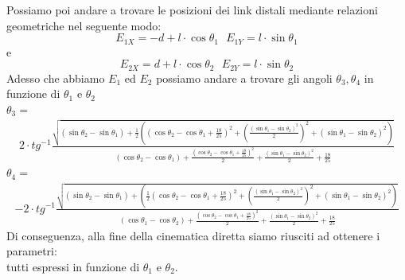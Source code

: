 Possiamo poi andare a trovare le posizioni dei link distali mediante relazioni geometriche nel seguente modo: 
\begin{equation*}
    E_{1X} = -d+l\cdot \cos\theta_1 \ \ \  E_{1Y}=l\cdot \sin\theta_1
\end{equation*}
e
\begin{equation*}
    E_{2X} = d+ l\cdot \cos\theta_2 \ \ \  E_{2Y} = l\cdot \sin\theta_2
\end{equation*}
Adesso che abbiamo $E_1$ ed $E_2$ possiamo andare a trovare gli angoli $\theta_3 , \theta_4$ in funzione di $\theta_1$ e $\theta_2$
\\$\theta_3 =$
\begin{equation*}
    \begin{aligned}
    2\cdot tg^{-1}\frac{\sqrt{ (\sin\theta_2 - \sin\theta_1) + \frac{1}{2}((\cos\theta_2 - \cos\theta_1 + \frac{18}{25})^2+(\frac{(\sin\theta_1-\sin\theta_2)^2}{2})^2+(\sin\theta_1-\sin\theta_2)^2)}}{(\cos\theta_2-\cos\theta_1)+\frac{(\cos\theta_2-\cos\theta_1+\frac{18}{25})^2}{2}+\frac{(\sin\theta_1-\sin\theta_2)^2}{2}+\frac{18}{25}}
    \end{aligned}
\end{equation*}
$\theta_4 =$
\begin{equation*}
    \begin{aligned}
    -2\cdot tg^{-1}\frac{\sqrt{(\sin\theta_2-\sin\theta_1)+(\frac{1}{2}(\cos\theta_2-\cos\theta_1+\frac{18}{25})^2+(\frac{(\sin\theta_1-\sin\theta_2)^2}{2})^2+(\sin\theta_1-\sin\theta_2)^2)}}
    {(\cos\theta_1 -\cos\theta_2)+\frac{(\cos\theta_2-\cos\theta_1+\frac{18}{25})^2}{2}+\frac{(\sin\theta_1-\sin\theta_2)^2}{2}+\frac{18}{25}}
    \end{aligned}
\end{equation*}
Di conseguenza, alla fine della cinematica diretta siamo riusciti ad ottenere i parametri:
\begin{equation*}
	[x,y, E1, E2, \theta_3, \theta_4]
\end{equation*}
tutti espressi in funzione di $\theta_1$ e $\theta_2$.
